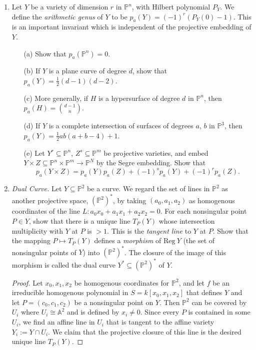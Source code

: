 \documentclass[12pt]{article}
\newcommand{\A}{\mathbb{A}}
\newcommand{\PP}{\mathbb{P}}
\theoremstyle{definition}
\begin{document}
\begin{enumerate} [label=\textbf{\arabic*.}, leftmargin=-0.05em]
\item Let $Y$ be a variety of dimension $r$ in $\PP^n$, with Hilbert polynomial $P_Y$. We define the \textit{arithmetic genus} of $Y$ to be $p_a(Y) = (-1)^r(P_Y(0) - 1)$. This is an important invariant which is independent of the projective embedding of $Y$.
\begin{itemize}
  \item[(a)] Show that $p_a(\PP^n) = 0$.
  \item[(b)] If $Y$ is a plane curve of degree $d$, show that $p_a(Y) = \frac{1}{2}(d - 1)(d - 2)$.
  \item[(c)] More generally, if $H$ is a hypersurface of degree $d$ in $\PP^n$, then $p_a(H) = {d - 1 \choose n}$.
  \item[(d)] If $Y$ is a complete intersection of surfaces of degrees $a$, $b$ in $\PP^3$, then $p_a(Y) = \frac{1}{2}ab(a + b - 4) + 1$.
  \item[(e)] Let $Y^r \subseteq \PP^n$, $Z^s \subseteq \PP^m$ be projective varieties, and embed $Y \times Z \subseteq \PP^n \times \PP^m \to \PP^N$ by the Segre embedding. Show that
  \begin{equation*}
    p_a(Y \times Z) = p_a(Y)p_a(Z) + (-1)^s p_a(Y) + (-1)^r p_a(Z).
  \end{equation*}
\end{itemize}

\newpage

\item \textit{Dual Curve.} Let $Y \subseteq \PP^2$ be a curve. We regard the set of lines in $\PP^2$ as another projective space, $(\PP^2)^*$, by taking $(a_0, a_1, a_2)$ as homogenous coordinates of the line $L : a_0 x_0 + a_1 x_1 + a_2 x_2 = 0$. For each nonsingular point $P \in Y$, show that there is a unique line $T_P(Y)$ whose intersection multiplicity with $Y$ at $P$ is $ > 1$. This is the \textit{tangent line} to $Y$ at $P$. Show that the mapping $P \mapsto T_P(Y)$ defines a \textit{morphism} of $\text{Reg}~Y$ (the set of nonsingular points of $Y$) into $(\PP^2)^*$. The closure of the image of this morphism is called the dual curve $Y^* \subseteq (\PP^2)^*$ of $Y$.

\begin{proof}
  Let $x_0, x_1, x_2$ be homogenous coordinates for $\PP^2$, and let $f$ be an irreducible homogenous polynomial in $S = k[x_0, x_1, x_2]$ that defines $Y$ and let $P = (c_0, c_1, c_2)$ be a nonsingular point on $Y$. Then $\PP^2$ can be covered by $U_i$ where $U_i \cong \A^2$ and is defined by $x_i \neq 0$. Since every $P$ is contained in some $U_i$, we find an affine line in $U_i$ that is tangent to the affine variety $Y_i := Y \cap U_i$. We claim that the projective closure of this line is the desired unique line $T_P(Y)$.


\end{proof}
\end{enumerate}
\end{document}
